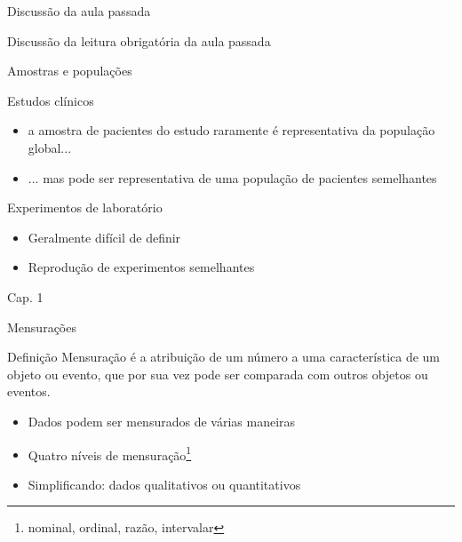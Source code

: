 \documentclass{beamer}
\begin{document}

\begin{frame}{\scriptsize Discussão da aula passada}
  \begin{block}{}
    Discussão da leitura obrigatória da aula passada
  \end{block}
\end{frame}

\begin{frame}{\scriptsize Amostras e populações}
  \begin{block}{Estudos clínicos}
    \begin{itemize}
      \footnotesize
    \item a amostra de pacientes do estudo raramente é representativa da população global...
    \item ... mas pode ser representativa de uma população de pacientes semelhantes
    \end{itemize}
  \end{block}
  \bigskip
  \begin{block}{Experimentos de laboratório}
    \begin{itemize}
      \footnotesize
    \item Geralmente difícil de definir
    \item Reprodução de experimentos semelhantes
    \end{itemize}
  \end{block}

  \vfill
  \hfill \scriptsize Cap. 1
\end{frame}

\begin{frame}{\scriptsize Mensurações}
  \begin{block}{Definição}
      \footnotesize
    Mensuração é a atribuição de um número a uma característica de um objeto ou evento, que por sua vez pode ser comparada com outros objetos ou eventos.
  \end{block}
  \bigskip
  \begin{itemize}
    \footnotesize
  \item Dados podem ser mensurados de várias maneiras
    \smallskip
  \item Quatro níveis de mensuração\footnote{nominal, ordinal, razão, intervalar}
    \smallskip
  \item Simplificando: dados \alert<2>{qualitativos} ou quantitativos
  \end{itemize}
  \bigskip
\end{frame}
\end{document}
